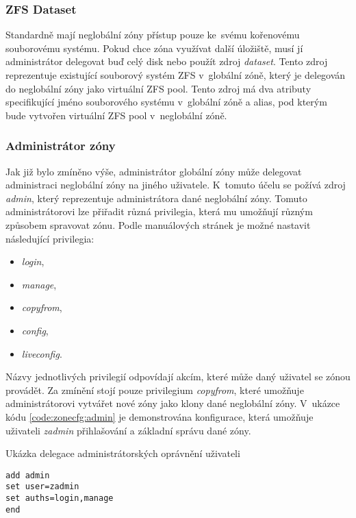 \subsubsection{ZFS Dataset}
\label{chapter:zones:configuration:resources:dataset}
Standardně mají neglobální zóny přístup pouze ke~svému kořenovému souborovému systému. Pokud chce zóna využívat
další úložiště, musí jí administrátor delegovat buď celý disk nebo použít zdroj \textit{dataset}. Tento zdroj reprezentuje
existující souborový systém ZFS v~globální zóně, který je delegován do neglobální zóny jako virtuální ZFS pool. Tento zdroj
má dva atributy specifikující jméno souborového systému v~globální zóně a alias, pod kterým bude vytvořen virtuální ZFS pool
v~neglobální zóně.
\subsubsection{Administrátor zóny}
\label{chapter:zones:configuration:resources:admin}
Jak již bylo zmíněno výše, administrátor globální zóny může delegovat 
administraci neglobální zóny na jiného uživatele. K~tomuto účelu se požívá zdroj \textit{admin}, který reprezentuje administrátora
dané neglobální zóny. Tomuto administrátorovi lze přiřadit různá privilegia, která mu umožňují různým způsobem spravovat zónu.
Podle manuálových stránek \cite{oracle:manpages:zonecfg} je možné nastavit následující privilegia:
\begin{itemize}
 \item \textit{login},
 \item \textit{manage},
 \item \textit{copyfrom},
 \item \textit{config},
 \item \textit{liveconfig}.
\end{itemize}
Názvy jednotlivých privilegií odpovídají akcím, které může daný uživatel se zónou provádět. Za zmínění stojí pouze
privilegium \textit{copyfrom}, které umožňuje administrátorovi vytvářet nové zóny jako klony dané neglobální zóny. V~ukázce kódu
\ref{code:zonecfg:admin} je demonstrována konfigurace, která umožňuje uživateli \textit{zadmin} přihlašování a základní správu
dané zóny.
\begin{listing}[ht]
  \caption{Ukázka delegace administrátorských oprávnění uživateli}
  \label{code:zonecfg:admin}  
  \begin{verbatim}
add admin
set user=zadmin
set auths=login,manage
end
  \end{verbatim}
\end{listing}
